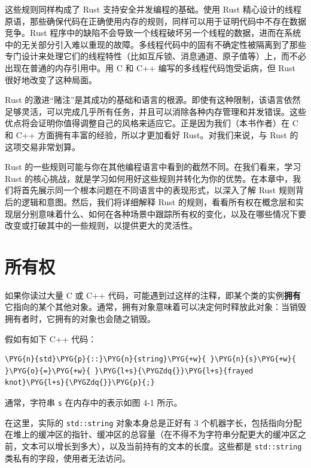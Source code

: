 这些规则同样构成了 Rust 支持安全并发编程的基础。使用 Rust 精心设计的线程原语，那些确保代码在正确使用内存的规则，同样可以用于证明代码中不存在数据竞争。Rust 程序中的缺陷不会导致一个线程破坏另一个线程的数据，进而在系统中的无关部分引入难以重现的故障。多线程代码中的固有不确定性被隔离到了那些专门设计来处理它们的线程特性（比如互斥锁、消息通道、原子值等）上，而不必出现在普通的内存引用中。用 C 和 C++ 编写的多线程代码饱受诟病，但 Rust 很好地改变了这种局面。

Rust 的激进“赌注”是其成功的基础和语言的根源。即使有这种限制，该语言依然足够灵活，可以完成几乎所有任务，并且可以消除各种内存管理和并发错误。这些优点将会证明你值得调整自己的风格来适应它。正是因为我们（本书作者）在 C 和 C++ 方面拥有丰富的经验，所以才更加看好 Rust。对我们来说，与 Rust 的这项交易非常划算。

Rust 的一些规则可能与你在其他编程语言中看到的截然不同。在我们看来，学习 Rust 的核心挑战，就是学习如何用好这些规则并转化为你的优势。在本章中，我们将首先展示同一个根本问题在不同语言中的表现形式，以深入了解 Rust 规则背后的逻辑和意图。然后，我们将详细解释 Rust 的规则，看看所有权在概念层和实现层分别意味着什么、如何在各种场景中跟踪所有权的变化，以及在哪些情况下要改变或打破其中的一些规则，以提供更大的灵活性。

\section{所有权}

如果你读过大量 C 或 C++ 代码，可能遇到过这样的注释，即某个类的实例\textbf{拥有}它指向的某个其他对象。通常，拥有对象意味着可以决定何时释放此对象：当销毁拥有者时，它拥有的对象也会随之销毁。

假如有如下 C++ 代码：

\begin{Verbatim}[commandchars=\\\{\},breaklines=true,breakanywhere=true,fontsize=\codefont,xleftmargin=17bp]
\PYG{n}{std}\PYG{p}{::}\PYG{n}{string}\PYG{+w}{ }\PYG{n}{s}\PYG{+w}{ }\PYG{o}{=}\PYG{+w}{ }\PYG{l+s}{\PYGZdq{}}\PYG{l+s}{frayed knot}\PYG{l+s}{\PYGZdq{}}\PYG{p}{;}
\end{Verbatim}

通常，字符串 \texttt{s} 在内存中的表示如图 4-1 所示。


在这里，实际的 \texttt{std::string} 对象本身总是正好有 3 个机器字长，包括指向分配在堆上的缓冲区的指针、缓冲区的总容量（在不得不为字符串分配更大的缓冲区之前，文本可以增长到多大），以及当前持有的文本的长度。这些都是 \texttt{std::string} 类私有的字段，使用者无法访问。

